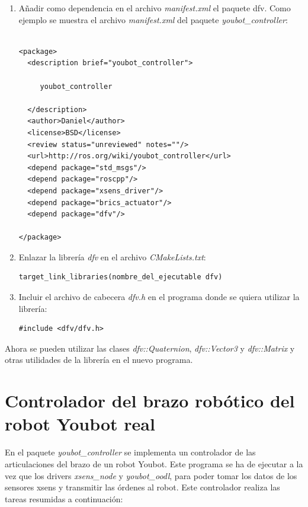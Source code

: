 \documentclass[12pt, a4paper]{report}
\begin{document}
\begin{enumerate}
\item Añadir como dependencia en el archivo \textit{manifest.xml} el paquete dfv. Como ejemplo se muestra el archivo \textit{manifest.xml} del paquete \textit{youbot\_controller}:

\begin{lstlisting}

<package>
  <description brief="youbot_controller">

     youbot_controller

  </description>
  <author>Daniel</author>
  <license>BSD</license>
  <review status="unreviewed" notes=""/>
  <url>http://ros.org/wiki/youbot_controller</url>
  <depend package="std_msgs"/>
  <depend package="roscpp"/>
  <depend package="xsens_driver"/>
  <depend package="brics_actuator"/>
  <depend package="dfv"/>

</package>

\end{lstlisting}

\item Enlazar la librería \textit{dfv} en el archivo \textit{CMakeLists.txt}:

\begin{lstlisting}
target_link_libraries(nombre_del_ejecutable dfv)
\end{lstlisting}

\item Incluir el archivo de cabecera \textit{dfv.h} en el programa donde se quiera utilizar la librería:

\begin{lstlisting}
#include <dfv/dfv.h>
\end{lstlisting}

\end{enumerate}

Ahora se pueden utilizar las clases \textit{dfv::Quaternion}, \textit{dfv::Vector3} y \textit{dfv::Matrix} y otras utilidades de la librería en el nuevo programa.

\section{Controlador del brazo robótico del robot Youbot real}

En el paquete \textit{youbot\_controller} se implementa un controlador de las articulaciones del brazo de un robot Youbot. Este programa se ha de ejecutar a la vez que los drivers \textit{xsens\_node} y \textit{youbot\_oodl}, para poder tomar los datos de los sensores xsens y transmitir las órdenes al robot. Este controlador realiza las tareas resumidas a continuación:
\end{document}
